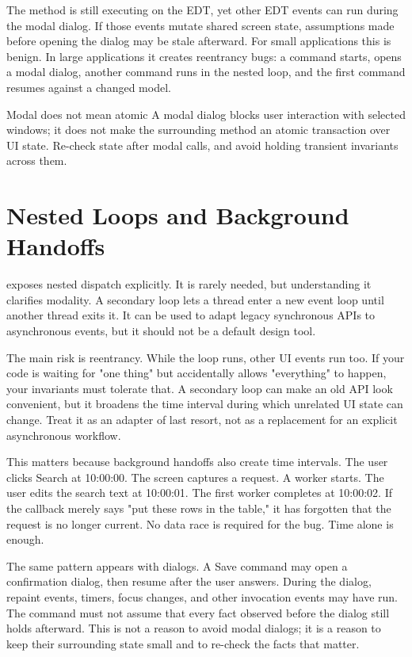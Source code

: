 The method is still executing on the EDT, yet other EDT events can run during the modal dialog. If those events mutate shared screen state, assumptions made before opening the dialog may be stale afterward. For small applications this is benign. In large applications it creates reentrancy bugs: a command starts, opens a modal dialog, another command runs in the nested loop, and the first command resumes against a changed model.

\begin{detailbox}{Modal does not mean atomic}
A modal dialog blocks user interaction with selected windows; it does not make the surrounding method an atomic transaction over UI state. Re-check state after modal calls, and avoid holding transient invariants across them.
\end{detailbox}

\section{Nested Loops and Background Handoffs}

 exposes nested dispatch explicitly. It is rarely needed, but understanding it clarifies modality. A secondary loop lets a thread enter a new event loop until another thread exits it. It can be used to adapt legacy synchronous APIs to asynchronous events, but it should not be a default design tool.

The main risk is reentrancy. While the loop runs, other UI events run too. If your code is waiting for "one thing" but accidentally allows "everything" to happen, your invariants must tolerate that. A secondary loop can make an old API look convenient, but it broadens the time interval during which unrelated UI state can change. Treat it as an adapter of last resort, not as a replacement for an explicit asynchronous workflow.

This matters because background handoffs also create time intervals. The user clicks Search at 10:00:00. The screen captures a request. A worker starts. The user edits the search text at 10:00:01. The first worker completes at 10:00:02. If the callback merely says "put these rows in the table," it has forgotten that the request is no longer current. No data race is required for the bug. Time alone is enough.

The same pattern appears with dialogs. A Save command may open a confirmation dialog, then resume after the user answers. During the dialog, repaint events, timers, focus changes, and other invocation events may have run. The command must not assume that every fact observed before the dialog still holds afterward. This is not a reason to avoid modal dialogs; it is a reason to keep their surrounding state small and to re-check the facts that matter.

